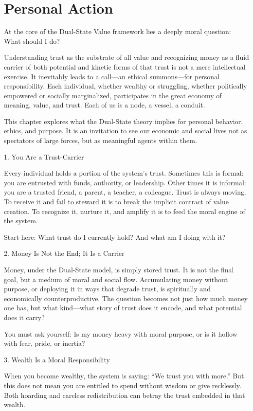 \documentclass[11pt,oneside]{book}
\begin{document}
\chapter{Personal Action}

At the core of the Dual-State Value framework lies a deeply moral question: What should I do?

Understanding trust as the substrate of all value and recognizing money as a fluid carrier of both potential and kinetic forms of that trust is not a mere intellectual exercise. It inevitably leads to a call—an ethical summons—for personal responsibility. Each individual, whether wealthy or struggling, whether politically empowered or socially marginalized, participates in the great economy of meaning, value, and trust. Each of us is a node, a vessel, a conduit.

This chapter explores what the Dual-State theory implies for personal behavior, ethics, and purpose. It is an invitation to see our economic and social lives not as spectators of large forces, but as meaningful agents within them.

1. You Are a Trust-Carrier


Every individual holds a portion of the system’s trust. Sometimes this is formal: you are entrusted with funds, authority, or leadership. Other times it is informal: you are a trusted friend, a parent, a teacher, a colleague. Trust is always moving. To receive it and fail to steward it is to break the implicit contract of value creation. To recognize it, nurture it, and amplify it is to feed the moral engine of the system.

Start here: What trust do I currently hold? And what am I doing with it?

2. Money Is Not the End; It Is a Carrier


Money, under the Dual-State model, is simply stored trust. It is not the final goal, but a medium of moral and social flow. Accumulating money without purpose, or deploying it in ways that degrade trust, is spiritually and economically counterproductive. The question becomes not just how much money one has, but what kind—what story of trust does it encode, and what potential does it carry?

You must ask yourself: Is my money heavy with moral purpose, or is it hollow with fear, pride, or inertia?

3. Wealth Is a Moral Responsibility


When you become wealthy, the system is saying: “We trust you with more.” But this does not mean you are entitled to spend without wisdom or give recklessly. Both hoarding and careless redistribution can betray the trust embedded in that wealth.
\end{document}

